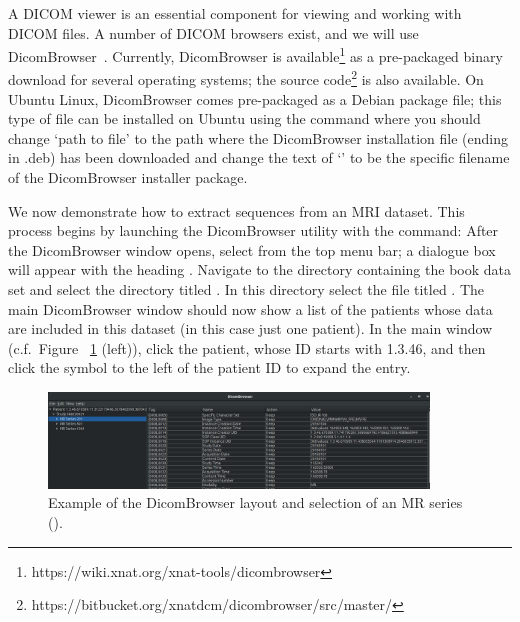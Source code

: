 A DICOM viewer is an essential component for viewing and working with
DICOM files. A number of DICOM browsers exist, and we will use
DicomBrowser~\cite{dicombrowser}.  Currently, DicomBrowser is
available\footnote{https://wiki.xnat.org/xnat-tools/dicombrowser} as a
pre-packaged binary download for several operating systems; the source
code\footnote{https://bitbucket.org/xnatdcm/dicombrowser/src/master/}
is also available. On Ubuntu Linux, DicomBrowser comes pre-packaged
as a Debian package file; this type of file can be installed on
Ubuntu using the command 
\noindent where you should change `path to file' to the path where the  
DicomBrowser installation file (ending in .deb) has been downloaded and change 
the text of `' to be the specific filename of the 
DicomBrowser installer package. 

We now demonstrate how to extract sequences from an MRI dataset. This
process begins by launching the DicomBrowser utility with the 
command: 
\noindent After the DicomBrowser window opens, select
 from the top menu bar; a dialogue box
will appear with the heading . Navigate to
the directory containing the book data set and select the directory
titled \emp{\erniedicom}.  In this directory select the file titled
. The main DicomBrowser window should now show a list of
the patients whose data are included in this dataset (in this case
just one patient).  In the main window (c.f.~Figure~%
\ref{fig:chp2:dicombrwsr-scr} (left)), click the patient, whose ID starts with 
1.3.46, and then click the symbol to the left of the patient ID to expand the 
entry.

\begin{figure}[h]
  \centering
  \includegraphics[width=0.9\textwidth]{./graphics/chp2/dicombrowser-d}
  \caption{Example of the DicomBrowser layout and selection of an MR series (\emp{\erniedicom}).} 
  \label{fig:chp2:dicombrwsr-scr}
\end{figure}

